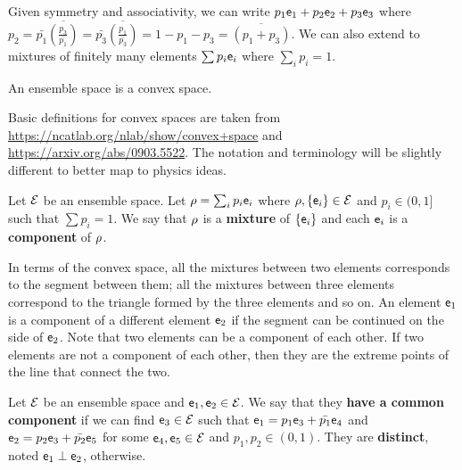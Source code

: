 \begin{remark}
	Given symmetry and associativity, we can write $p_1 \ens_1 + p_2 \ens_2 + p_3 \ens_3$ where $p_2 = \bar{p_1}\overline{\left(\frac{p_3}{\bar{p_1}}\right)} = \bar{p_3}\overline{\left(\frac{p_1}{\bar{p_3}}\right)} = 1 - p_1 - p_3 = \overline{\left(p_1 + p_3\right)}$. We can also extend to mixtures of finitely many elements $\sum p_i \ens_i$ where $\sum_i p_i = 1$.
\end{remark}

\begin{coro}
	An ensemble space is a convex space.
\end{coro}

\begin{remark}
	Basic definitions for convex spaces are taken from \url{https://ncatlab.org/nlab/show/convex+space} and \url{https://arxiv.org/abs/0903.5522}. The notation and terminology will be slightly different to better map to physics ideas. 
\end{remark}


\begin{defn}
	Let $\Ens$ be an ensemble space. Let $\ens[\rho] = \sum_i p_i \ens_i$ where $\ens[\rho], \{\ens_i\} \in \Ens$ and $p_i \in (0,1]$ such that $\sum p_i = 1$. We say that $\ens[\rho]$ is a \textbf{mixture} of $\{\ens_i\}$ and each $\ens_i$ is a \textbf{component} of $\ens[\rho]$.
\end{defn}

\begin{remark}
	In terms of the convex space, all the mixtures between two elements corresponds to the segment between them; all the mixtures between three elements correspond to the triangle formed by the three elements and so on. An element $\ens_1$ is a component of a different element $\ens_2$ if the segment can be continued on the side of $\ens_2$. Note that two elements can be a component of each other. If two elements are not a component of each other, then they are the extreme points of the line that connect the two.
\end{remark}

\begin{defn}
	Let $\Ens$ be an ensemble space and $\ens_1, \ens_2 \in \Ens$. We say that they \textbf{have a common component} if we can find $\ens_3 \in \Ens$ such that $\ens_1 = p_1 \ens_3 + \bar{p_1} \ens_4$ and $\ens_2 = p_2 \ens_3 + \bar{p_2} \ens_5$ for some $\ens_4, \ens_5 \in \Ens$ and $p_1, p_2 \in (0,1)$. They are \textbf{distinct}, noted $\ens_1 \distinct \ens_2$, otherwise.
\end{defn}

